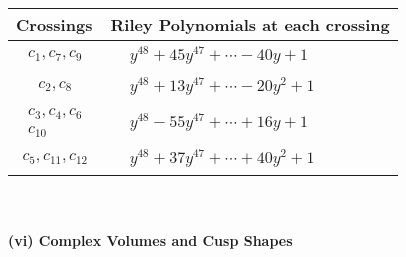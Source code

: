 \documentclass[1p]{elsarticle_modified}
\theoremstyle{definition}
\begin{document}
\begin{tabular}{m{50pt}|m{274pt}}
Crossings & \hspace{64pt}Riley Polynomials at each crossing \\
\hline $$\begin{aligned}c_{1},c_{7},c_{9}\end{aligned}$$&$\begin{aligned}
&y^{48}+45 y^{47}+\cdots-40 y+1
\end{aligned}$\\
\hline $$\begin{aligned}c_{2},c_{8}\end{aligned}$$&$\begin{aligned}
&y^{48}+13 y^{47}+\cdots-20 y^2+1
\end{aligned}$\\
\hline $$\begin{aligned}c_{3},c_{4},c_{6}\\c_{10}\end{aligned}$$&$\begin{aligned}
&y^{48}-55 y^{47}+\cdots+16 y+1
\end{aligned}$\\
\hline $$\begin{aligned}c_{5},c_{11},c_{12}\end{aligned}$$&$\begin{aligned}
&y^{48}+37 y^{47}+\cdots+40 y^2+1
\end{aligned}$\\
\hline
\end{tabular}\\~\\
\newpage\flushleft \textbf{(vi) Complex Volumes and Cusp Shapes}
\end{document}
